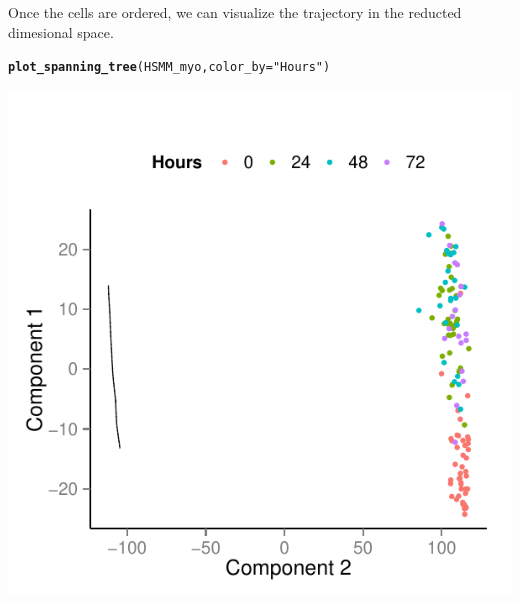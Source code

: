 \documentclass[10pt,oneside]{article}\usepackage[]{graphicx}\usepackage[]{color}
\makeatletter
\def\maxwidth{ %
  \ifdim\Gin@nat@width>\linewidth
    \linewidth
  \else
    \Gin@nat@width
  \fi
}
\newcommand{\hlstr}[1]{\textcolor[rgb]{0.192,0.494,0.8}{#1}}%
\newcommand{\hlstd}[1]{\textcolor[rgb]{0.345,0.345,0.345}{#1}}%
\newcommand{\hlkwc}[1]{\textcolor[rgb]{0.333,0.667,0.333}{#1}}%
\newcommand{\hlkwd}[1]{\textcolor[rgb]{0.737,0.353,0.396}{\textbf{#1}}}%
\newenvironment{kframe}{%
 \def\at@end@of@kframe{}%
 \ifinner\ifhmode%
  \def\at@end@of@kframe{\end{minipage}}%
  \begin{minipage}{\columnwidth}%
 \fi\fi%
 \def\FrameCommand##1{\hskip\@totalleftmargin \hskip-\fboxsep
 \colorbox{shadecolor}{##1}\hskip-\fboxsep
     \hskip-\linewidth \hskip-\@totalleftmargin \hskip\columnwidth}%
 \MakeFramed {\advance\hsize-\width
   \@totalleftmargin\z@ \linewidth\hsize
   \@setminipage}}%
 {\par\unskip\endMakeFramed%
 \at@end@of@kframe}
\newenvironment{knitrout}{}{} %
\makeatother
\begin{document}
Once the cells are ordered, we can visualize the trajectory in the reducted dimesional space.

\begin{knitrout}
\color{fgcolor}\begin{kframe}
\begin{alltt}
\hlkwd{plot_spanning_tree}\hlstd{(HSMM_myo,} \hlkwc{color_by}\hlstd{=}\hlstr{"Hours"}\hlstd{)}
\end{alltt}
\end{kframe}

{\centering \includegraphics[width=\maxwidth]{figure/plot_ordering_mst-1} 

}



\end{knitrout}
\end{document}
